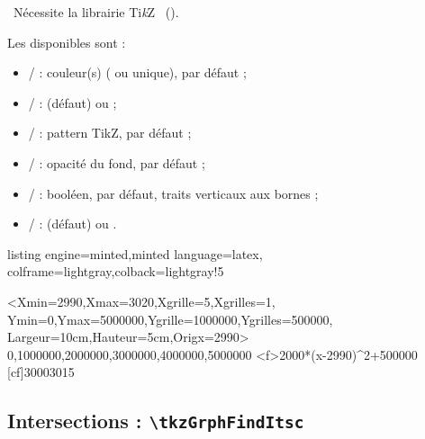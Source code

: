 \documentclass[11pt,a4paper]{ltxdoc}
\providecommand\tikzlogo{Ti\textit{k}Z}
\let\TikZ\tikzlogo
\begin{document}
{\footnotesize\faBomb}~Nécessite la librairie \TikZ\  ().

\smallskip

Les \MontreCode{[clés]} disponibles sont :

\begin{itemize}
	\item {} /  : couleur(s) ( ou unique),  par défaut ;
	\item {} /  :  (défaut) ou  ;
	\item {} /  : pattern TikZ,  par défaut ;
	\item {} /  : opacité du fond,  par défaut ;
	\item {} /  : booléen,  par défaut, traits verticaux aux bornes ;
	\item {} /  :  (défaut) ou .
\end{itemize}

\begin{tcblisting}{listing engine=minted,minted language=latex,
  colframe=lightgray,colback=lightgray!5}
\begin{tkzGrph}%
    <Xmin=2990,Xmax=3020,Xgrille=5,Xgrilles=1,
    Ymin=0,Ymax=5000000,Ygrille=1000000,Ygrilles=500000,
    Largeur=10cm,Hauteur=5cm,Origx=2990>
    {0,1000000,2000000,3000000,4000000,5000000}
  \tkzGrphDefineCurve[draw=false,name=cf]<f>{2000*(x-2990)^2+500000}
  [cf]{3000}{3015}
\end{tkzGrph}
\end{tcblisting}

\pagebreak

\subsection{Intersections : \texttt{\textbackslash tkzGrphFindItsc}}
\end{document}
